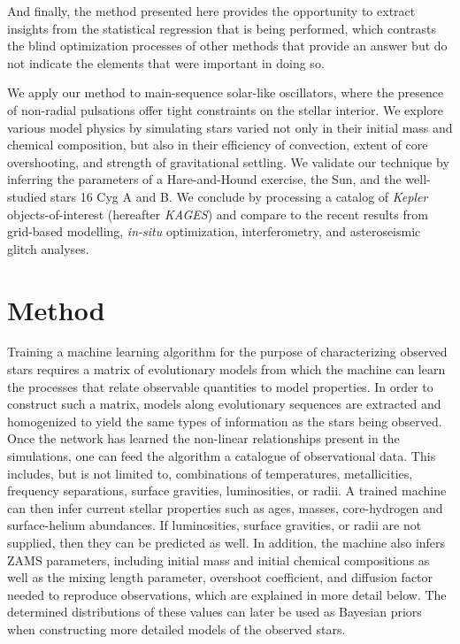 \documentclass[manuscript]{aastex}
\begin{document}
And finally, the method presented here provides the opportunity to extract insights from the statistical regression that is being performed, which contrasts the blind optimization processes of other methods that provide an answer but do not indicate the elements that were important in doing so. 

We apply our method to main-sequence solar-like oscillators, where the presence of non-radial pulsations offer tight constraints on the stellar interior. We explore various model physics by simulating stars varied not only in their initial mass and chemical composition, but also in their efficiency of convection, extent of core overshooting, and strength of gravitational settling. We validate our technique by inferring the parameters of a Hare-and-Hound exercise, the Sun, and the well-studied stars 16 Cyg A and B. %
We conclude by processing a catalog of \emph{Kepler} objects-of-interest (hereafter \emph{KAGES}) and compare to the recent results from grid-based modelling, \emph{in-situ} optimization, interferometry, and asteroseismic glitch analyses. 


\section{Method} \label{sec:Method} 
Training a machine learning algorithm for the purpose of characterizing observed stars requires a matrix of evolutionary models from which the machine can learn the processes that relate observable quantities to model properties. In order to construct such a matrix, models along evolutionary sequences are extracted and homogenized to yield the same types of information as the stars being observed. Once the network has learned the non-linear relationships present in the simulations, one can feed the algorithm a catalogue of observational data. This includes, but is not limited to, combinations of 
temperatures, metallicities, frequency separations, surface gravities, luminosities, or radii. %
A trained machine can then infer current stellar properties such as ages, masses, core-hydrogen and surface-helium abundances. If luminosities, surface gravities, or radii are not supplied, then they can be predicted as well. In addition, the machine also infers ZAMS parameters, including initial mass and initial chemical compositions as well as the mixing length parameter, overshoot coefficient, and diffusion factor needed to reproduce observations, which are explained in more detail below. The determined distributions of these values can later be used as Bayesian priors when constructing more detailed models of the observed stars. 
\end{document}
